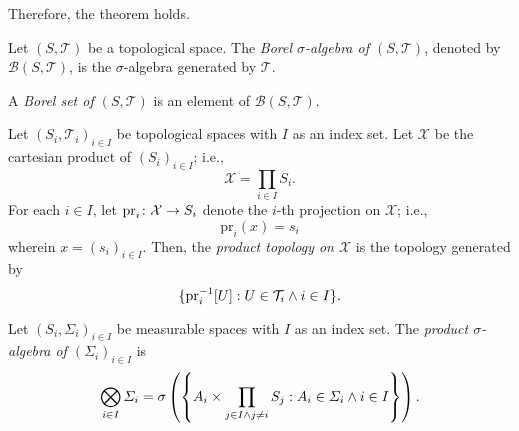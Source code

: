   Therefore, the theorem holds.
\Epr

\Bdf
  Let \((S, \mathcal{T})\) be a topological space. The \emph{Borel \(\sigma\)-algebra of \((S, \mathcal{T})\)}, denoted
  by \(\mathcal{B}(S, \mathcal{T})\), is the \(\sigma\)-algebra generated by \(\mathcal{T}\).

  A \emph{Borel set of \((S, \mathcal{T})\)} is an element of \(\mathcal{B}(S, \mathcal{T})\).
\Edf

Let \((S_i, \mathcal{T}_i)_{i \in I}\) be topological spaces with \(I\) as an index set. Let \(\mathcal{X}\) be the
cartesian product of \((S_i)_{i \in I}\); i.e.,
\[
  \mathcal{X} = \prod_{i \in I} S_i.
\]
For each \(i \in I\), let \(\map{\text{pr}_i}{\mathcal{X}}{S_i}\) denote the \(i\)-th projection on \(\mathcal{X}\);
i.e.,
\[
  \text{pr}_i(x) = s_i
\]
wherein \(x = (s_i)_{i \in I}\). Then, the \emph{product topology on \(\mathcal{X}\)} is the topology generated by
\[
  \set{\text{pr}_i^{-1}[U] : U \in \mathcal{T}_i \land i \in I}.
\]

Let \((S_i, \varSigma_i)_{i \in I}\) be measurable spaces with \(I\) as an index set. The \emph{product
\(\sigma\)-algebra of \((\varSigma_i)_{i \in I}\)} is
\[
  \bigotimes_{i \in I} \varSigma_i = \sigma\left(\set*{A_i \times \prod_{j \in I \land j \ne i} S_j :
  A_i \in \varSigma_i \land i \in I}\right).
\]

\Edc
